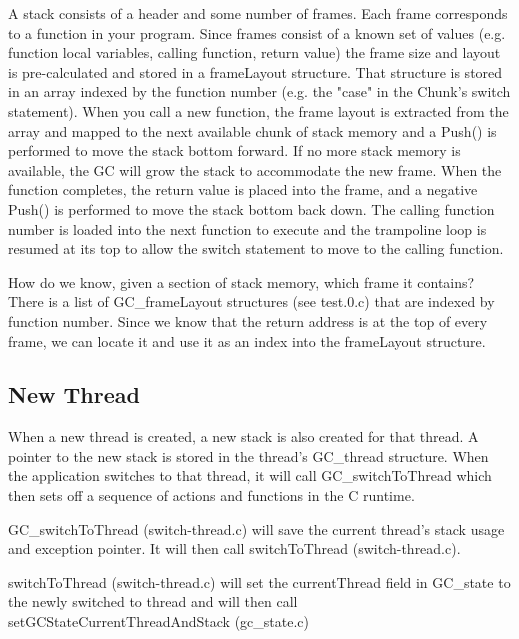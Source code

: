 A stack consists of a header and some number of frames. Each frame corresponds to a function in your program. Since frames consist of a known set of values (e.g. function local variables, calling function, return value) the frame size and layout is pre-calculated and stored in a frameLayout structure. That structure is stored in an array indexed by the function number (e.g. the "case" in the Chunk's switch statement). When you call a new function, the frame layout is extracted from the array and mapped to the next available chunk of stack memory and a Push() is performed to move the stack bottom forward. If no more stack memory is available, the GC will grow the stack to accommodate the new frame. When the function completes, the return value is placed into the frame, and a negative Push() is performed to move the stack bottom back down. The calling function number is loaded into the next function to execute and the trampoline loop is resumed at its top to allow the switch statement to move to the calling function.

How do we know, given a section of stack memory, which frame it contains? There is a list of GC\_frameLayout structures (see test.0.c) that are indexed by function number. Since we know that the return address is at the top of every frame, we can locate it and use it as an index into the frameLayout structure. 

\subsection{New Thread}

When a new thread is created, a new stack is also created for that thread. A pointer to the new stack is stored in the thread's GC\_thread structure. When the application switches to that thread, it will call GC\_switchToThread which then sets off a sequence of actions and functions in the C runtime.

GC\_switchToThread (switch-thread.c) will save the current thread's stack usage and exception pointer. It will then call switchToThread (switch-thread.c).

switchToThread (switch-thread.c) will set the currentThread field in GC\_state to the newly
switched to thread and will then call setGCStateCurrentThreadAndStack (gc\_state.c)

